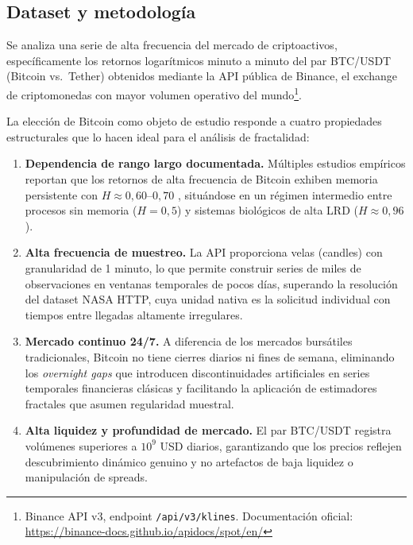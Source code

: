 
\subsection{Dataset y metodología}

Se analiza una serie de alta frecuencia del mercado de criptoactivos,
específicamente los retornos logarítmicos minuto a minuto del par
BTC/USDT (Bitcoin vs.~Tether) obtenidos mediante la API pública de
Binance, el exchange de criptomonedas con mayor volumen operativo
del mundo\footnote{Binance API v3, endpoint \texttt{/api/v3/klines}.
Documentación oficial: \url{https://binance-docs.github.io/apidocs/spot/en/}}.

La elección de Bitcoin como objeto de estudio responde a cuatro propiedades
estructurales que lo hacen ideal para el análisis de fractalidad:

\begin{enumerate}[leftmargin=2em]
    \item \textbf{Dependencia de rango largo documentada.}
          Múltiples estudios empíricos reportan que los retornos de alta
          frecuencia de Bitcoin exhiben memoria persistente con
          $H \approx 0{,}60$--$0{,}70$
          \cite{bariviera2017inefficiency,dionisio2022long},
          situándose en un régimen intermedio entre procesos sin memoria
          ($H=0{,}5$) y sistemas biológicos de alta LRD ($H\approx0{,}96$).

    \item \textbf{Alta frecuencia de muestreo.}
          La API proporciona velas (candles) con granularidad de 1 minuto,
          lo que permite construir series de miles de observaciones en
          ventanas temporales de pocos días, superando la resolución del
          dataset NASA HTTP, cuya unidad nativa es la solicitud individual
          con tiempos entre llegadas altamente irregulares.

    \item \textbf{Mercado continuo 24/7.}
          A diferencia de los mercados bursátiles tradicionales, Bitcoin
          no tiene cierres diarios ni fines de semana, eliminando los
          \textit{overnight gaps} que introducen discontinuidades artificiales
          en series temporales financieras clásicas y facilitando la
          aplicación de estimadores fractales que asumen regularidad
          muestral.

    \item \textbf{Alta liquidez y profundidad de mercado.}
          El par BTC/USDT registra volúmenes superiores a $10^9$ USD diarios,
          garantizando que los precios reflejen descubrimiento dinámico
          genuino y no artefactos de baja liquidez o manipulación de
          spreads.
\end{enumerate}

